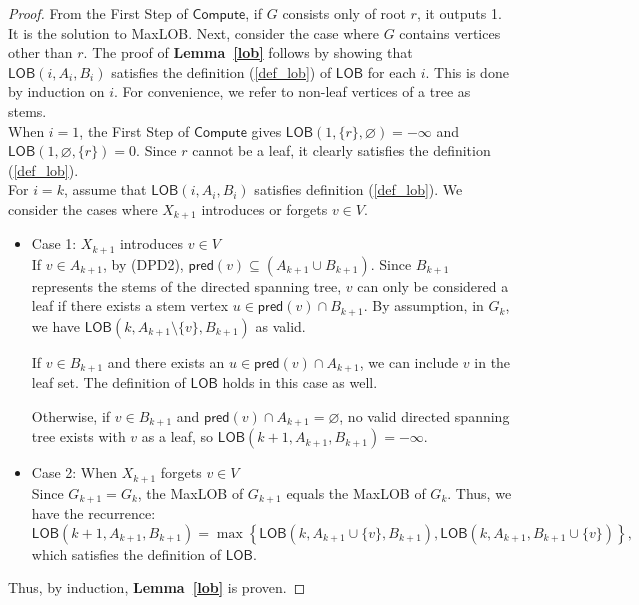 \documentclass[runningheads]{llncs}
\theoremstyle{plain}
\theoremstyle{definition}
\begin{document}
\begin{proof}
    From the First Step of $\mathsf{Compute}$, if $G$ consists only of root $r$, it outputs 1. It is the solution to MaxLOB. Next, consider the case where $G$ contains vertices other than $r$. The proof of \textbf{Lemma~\ref{lob}} follows by showing that $\mathsf{LOB}(i, A_i, B_i)$ satisfies the definition (\ref{def_lob}) of $\mathsf{LOB}$ for each $i$. This is done by induction on $i$. For convenience, we refer to non-leaf vertices of a tree as stems.\\
    When $i=1$, the First Step of $\mathsf{Compute}$ gives $\mathsf{LOB}(1, \{r\}, \varnothing) = -\infty$ and \\ $\mathsf{LOB}(1, \varnothing, \{r\}) = 0$. Since $r$ cannot be a leaf, it clearly satisfies the definition (\ref{def_lob}).\\
    For $i=k$, assume that $\mathsf{LOB}(i, A_i, B_i)$ satisfies definition (\ref{def_lob}). We consider the cases where $X_{k+1}$ introduces or forgets $v \in V$.
    \begin{itemize}
        \item Case 1: $X_{k+1}$ introduces $v \in V$
        \\
        If $v \in A_{k+1}$, by (DPD2), $\mathsf{pred}(v) \subseteq (A_{k+1} \cup B_{k+1})$. Since $B_{k+1}$ represents the stems of the directed spanning tree, $v$ can only be considered a leaf if there exists a stem vertex $u \in \mathsf{pred}(v) \cap B_{k+1}$. By assumption, in $G_k$, we have $\mathsf{LOB}(k, A_{k+1} \setminus \{v\}, B_{k+1})$ as valid.
        
        If $v \in B_{k+1}$ and there exists an $u \in \mathsf{pred}(v) \cap A_{k+1}$, we can include $v$ in the leaf set. The definition of $\mathsf{LOB}$ holds in this case as well.

        Otherwise, if $v \in B_{k+1}$ and $\mathsf{pred}(v) \cap A_{k+1} = \varnothing$, no valid directed spanning tree exists with $v$ as a leaf, so $\mathsf{LOB}(k+1, A_{k+1}, B_{k+1}) = -\infty$.

        \item Case 2: When $X_{k+1}$ forgets $v \in V$
        \\
        Since $G_{k+1} = G_k$, the MaxLOB of $G_{k+1}$ equals the MaxLOB of $G_k$. Thus, we have the recurrence:
        \[
        \mathsf{LOB}(k+1, A_{k+1}, B_{k+1}) = \max \left\{ \mathsf{LOB}(k, A_{k+1} \cup \{v\}, B_{k+1}), \mathsf{LOB}(k, A_{k+1}, B_{k+1} \cup \{v\}) \right\},
        \]
        which satisfies the definition of $\mathsf{LOB}$.
    \end{itemize}
    Thus, by induction, \textbf{Lemma~\ref{lob}} is proven.
\end{proof}
\end{document}
